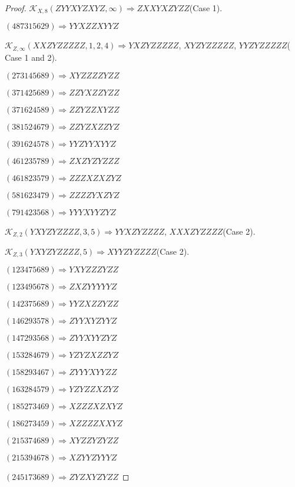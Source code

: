 \documentclass[12pt]{article}
\theoremstyle{plain}
\theoremstyle{definition}
\theoremstyle{remark}
\newcommand{\fancy}[1]{\mathcal{#1}}
\def\K{\fancy{K}}
\begin{document}
\begin{proof}
	$\K_{X,8}(ZYYXYZXYZ,\infty)\Rightarrow $$ZXXYXZYZZ$(Case 1).
	
	
	
	$(4 8 7 3 1 5 6 2 9)\Rightarrow YYXZZXYYZ$
	
	
	
	$\K_{Z,\infty}(XXZYZZZZZ,1, 2, 4)\Rightarrow $$YXZYZZZZZ$, $XYZYZZZZZ$, $YYZYZZZZZ$( Case 1 and 2).
	
	
	
	$(2 7 3 1 4 5 6 8 9)\Rightarrow XYZZZZYZZ$
	
	$(3 7 1 4 2 5 6 8 9)\Rightarrow ZZYXZZYZZ$
	
	$(3 7 1 6 2 4 5 8 9)\Rightarrow ZZYZZXYZZ$
	
	$(3 8 1 5 2 4 6 7 9)\Rightarrow ZZYZXZZYZ$
	
	$(3 9 1 6 2 4 5 7 8)\Rightarrow YYZYYXYYZ$
	
	$(4 6 1 2 3 5 7 8 9)\Rightarrow ZXZYZYZZZ$
	
	$(4 6 1 8 2 3 5 7 9)\Rightarrow ZZZXZXZYZ$
	
	$(5 8 1 6 2 3 4 7 9)\Rightarrow ZZZZYXZYZ$
	
	$(7 9 1 4 2 3 5 6 8)\Rightarrow YYYXYYZYZ$
	
	
	
	$\K_{Z,2}(YXYZYZZZZ,3, 5)\Rightarrow $$YYXZYZZZZ$, $XXXZYZZZZ$(Case 2).
	
	$\K_{Z,3}(YXYZYZZZZ,5)\Rightarrow $$XYYZYZZZZ$(Case 2).
	
	
	
	$(1 2 3 4 7 5 6 8 9)\Rightarrow YXYZZZYZZ$
	
	$(1 2 3 4 9 5 6 7 8)\Rightarrow ZXZYYYYYZ$
	
	$(1 4 2 3 7 5 6 8 9)\Rightarrow YYZXZZYZZ$
	
	$(1 4 6 2 9 3 5 7 8)\Rightarrow ZYYXYZYYZ$
	
	$(1 4 7 2 9 3 5 6 8)\Rightarrow ZYYXYYZYZ$
	
	$(1 5 3 2 8 4 6 7 9)\Rightarrow YZYZXZZYZ$
	
	$(1 5 8 2 9 3 4 6 7)\Rightarrow ZYYYXYYZZ$
	
	$(1 6 3 2 8 4 5 7 9)\Rightarrow YZYZZXZYZ$
	
	$(1 8 5 2 7 3 4 6 9)\Rightarrow XZZZXZXYZ$
	
	$(1 8 6 2 7 3 4 5 9)\Rightarrow XZZZZXXYZ$
	
	$(2 1 5 3 7 4 6 8 9)\Rightarrow XYZZYZYZZ$
	
	$(2 1 5 3 9 4 6 7 8)\Rightarrow XZYYZYYYZ$
	
	$(2 4 5 1 7 3 6 8 9)\Rightarrow ZYZXYZYZZ$
	

\end{proof}
\end{document}
